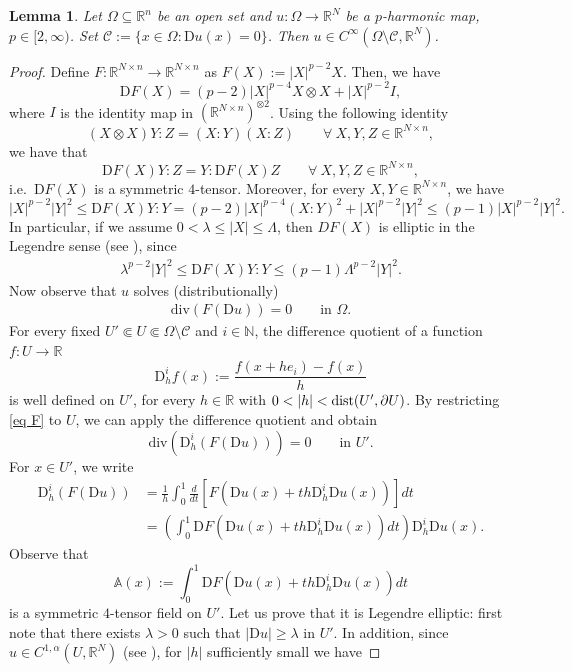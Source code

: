 \documentclass[a4paper,11pt]{article}
\numberwithin{equation}{section}
\newtheorem{Lemma}[Theorem]{Lemma}
\newcommand{\numberset}{\mathbb}
\newcommand{\N}{\numberset{N}}
\newcommand{\Om}{\Omega}
\newcommand{\R}{\numberset{R}}
\newcommand{\rom}{\mathrm}
\theoremstyle{definition}
\begin{document}
\begin{Lemma}\label{smoothness}
Let $\Om\subseteq\R^n$ be an open set and $u:\Om\longrightarrow \R^N$ be a $p$-harmonic map, $p\in[2,\infty)$. Set $\mathscr{C}:=\{x\in\Om:\mathrm Du(x)=0\}$. Then $u\in C^\infty(\Omega\setminus\mathscr C, \R^N)$.
\end{Lemma}
\begin{proof}
Define $F:\R^{N\times n}\longrightarrow  \R^{N\times n}$ as $F(X):=|X|^{p-2}X$. Then, we have
$$
\rom DF(X)=(p-2)|X|^{p-4}X\otimes X+|X|^{p-2}I,
$$
where $I$ is the identity map in $(\R^{N\times n})^{\otimes 2}$.
Using the following identity
$$
(X\otimes X)Y:Z=(X:Y)(X:Z)\qquad\forall\  X,Y,Z\in \R^{N\times n},
$$ 
we have that
$$
\rom DF(X) Y:Z=Y:\rom DF(X)Z\qquad\forall\  X,Y,Z\in \R^{N\times n},
$$
i.e.\ $\rom DF(X)$ is a symmetric $4$-tensor.
Moreover, for every $X,Y\in \R^{N\times n}$, we have
$$
|X|^{p-2}|Y|^2\leq \rom DF(X)Y:Y=(p-2)|X|^{p-4}(X:Y)^2+|X|^{p-2}|Y|^2\leq(p-1)|X|^{p-2}|Y|^2.
$$
In particular, if we assume $0<\lambda\leq|X|\leq\Lambda$, then $DF(X)$ is elliptic in the Legendre sense (see \cite{GM}), since
\begin{align}\label{ellip}
\lambda^{p-2}|Y|^2\leq \rom DF(X)Y:Y\leq(p-1)\Lambda^{p-2}|Y|^2.
\end{align}
Now observe that $u$ solves (distributionally)
\begin{align}\label{eq F}
\mathrm{div}(F(\rom Du))=0 \qquad\mbox{in }\Om.
\end{align}
For every fixed $U'\Subset U\Subset\Omega\setminus\mathscr C$ and $i\in\N$, the difference quotient of a function $f:U\longrightarrow  \R$
$$
\rom D_h^if(x):=\frac{f(x+he_i)-f(x)}{h}
$$
is well defined on $U'$, for every $h\in \R$ with $0<|h|<{\rm dist}(U',\partial U)$. By restricting \eqref{eq F} to $U$, we can apply the difference quotient and obtain
$$
\mathrm{div}(\rom D_h^i(F(\rom Du)))=0 \qquad\mbox{in }U'.
$$
For $x\in U'$, we write
\begin{align*}
\rom D_h^i(F(\rom Du))&=\frac{1}{h}\int_0^1\frac{d}{dt} \left[F\left(\rom Du(x)+th\rom D_h^i\rom Du(x)\right)\right]dt\\
&=\left(\int_0^1\rom DF\left(\rom Du(x)+th\rom D_h^i\rom Du(x)\right)dt\right) \rom D_h^i \rom Du(x).
\end{align*}
Observe that
$$
\mathbb A(x):=\int_0^1\rom DF\left(\rom Du(x)+th\rom D_h^i\rom Du(x)\right)dt
$$
is a symmetric $4$-tensor field on $U'$. Let us prove that it is Legendre elliptic: first note that there exists $\lambda>0$ such that $|\rom Du|\geq\lambda$ in $U'$. In addition, since $u\in C^{1,\alpha}(U,\R^N)$ (see \cite{U}), for $|h|$ sufficiently small we have

\end{proof}
\end{document}
